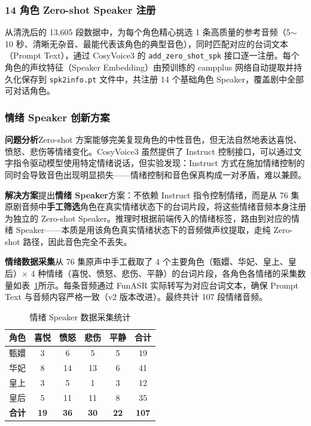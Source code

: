 \documentclass[12pt,a4paper]{article}
\begin{document}
\subsubsection{14 角色 Zero-shot Speaker 注册}

从清洗后的 13,605 段数据中，为每个角色精心挑选 1 条高质量的参考音频（5$\sim$ 10 秒、清晰无杂音、最能代表该角色的典型音色），同时匹配对应的台词文本（Prompt Text），通过 CosyVoice3 的 \texttt{add\_zero\_shot\_spk} 接口逐一注册。每个角色的声纹特征（Speaker Embedding）由预训练的 campplus 网络自动提取并持久化保存到 \texttt{spk2info.pt} 文件中，共注册 14 个基础角色 Speaker，覆盖剧中全部可对话角色。

\subsubsection{情绪 Speaker 创新方案}

\textbf{问题分析}\quad Zero-shot 方案能够完美复现角色的中性音色，但无法自然地表达喜悦、愤怒、悲伤等情绪变化。CosyVoice3 虽然提供了 Instruct 控制接口，可以通过文字指令驱动模型使用特定情绪说话，但实验发现：Instruct 方式在施加情绪控制的同时会导致音色出现明显损失——情绪控制和音色保真构成一对矛盾，难以兼顾。

\textbf{解决方案}\quad 提出\textbf{情绪 Speaker}方案：不依赖 Instruct 指令控制情绪，而是从 76 集原剧音频中\textbf{手工筛选}角色在真实情绪状态下的台词片段，将这些情绪音频本身注册为独立的 Zero-shot Speaker。推理时根据前端传入的情绪标签，路由到对应的情绪 Speaker——本质是用该角色真实情绪状态下的音频做声纹提取，走纯 Zero-shot 路径，因此音色完全不丢失。

\textbf{情绪数据采集}\quad 从 76 集原声中手工截取了 4 个主要角色（甄嬛、华妃、皇上、皇后）$\times$ 4 种情绪（喜悦、愤怒、悲伤、平静）的台词片段，各角色各情绪的采集数量如表~\ref{tab:emotion-data}所示。每条音频通过 FunASR 实际转写为对应台词文本，确保 Prompt Text 与音频内容严格一致（v2 版本改进）。最终共计 107 段情绪音频。

\begin{table}[H]
\centering
\caption{情绪 Speaker 数据采集统计}
\label{tab:emotion-data}
\begin{tabular}{cccccc}
\toprule
\textbf{角色} & \textbf{喜悦} & \textbf{愤怒} & \textbf{悲伤} & \textbf{平静} & \textbf{合计} \\
\midrule
\rowcolor{Amid!10} 甄嬛 & 3  & 6  & 5  & 5  & 19 \\
\rowcolor{Amid!6}  华妃 & 8  & 14 & 13 & 6  & 41 \\
\rowcolor{Amid!10} 皇上 & 3  & 5  & 1  & 3  & 12 \\
\rowcolor{Amid!6}  皇后 & 5  & 11 & 11 & 8  & 35 \\
\midrule
\textbf{合计} & \textbf{19} & \textbf{36} & \textbf{30} & \textbf{22} & \textbf{107} \\
\bottomrule
\end{tabular}
\end{table}
\end{document}
